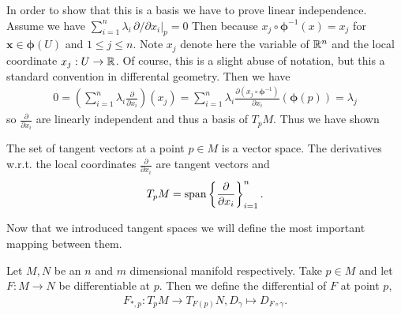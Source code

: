 \documentclass[../main.tex]{subfiles}
\begin{document}
In order to show that this is a basis we have to prove linear independence.
Assume we have $\sum_{i=1}^n \lambda_i \, \partial/\partial x_i|_p = 0$
Then because $x_j \circ \bm{\phi}^{-1} (x) = x_j$ for $\mathbf{x} \in \bm{\phi}(U)$ and 
$1 \leq j \leq n$. Note $x_j$ denote here the variable of 
$\mathbb{R}^n$ and the local coordinate $x_j:U \rightarrow \mathbb{R}$. Of course, 
this is a slight abuse of notation, but this a standard convention in 
differental geometry.
Then we have 
\begin{align*}
    0 = \left( \sum\limits_{i=1}^n \lambda_i \frac{\partial}{\partial x_i}
        \right) (x_j)
    = \sum\limits_{i=1}^n \lambda_i \frac{\partial (x_j \circ \bm{\phi}^{-1})}{\partial x_i}(\bm{\phi}(p))
    = \lambda_j
\end{align*}
so $\frac{\partial}{\partial x_i}$ are
linearly independent and thus a basis of $T_p M$. Thus we have shown

\begin{proposition}
    The set of tangent vectors at a point $p \in M$ is a vector space. 
    The derivatives w.r.t. the local coordinates $\frac{\partial}{\partial x_i}$ 
    are tangent vectors and 
    \begin{align*}
        T_p M = \operatorname{span} \left\{ \frac{\partial}{\partial x_i} \right\} _{i=1}^n.
    \end{align*}
\end{proposition}

Now that we introduced tangent spaces we will define the most important 
mapping between them.
\begin{definition}[Differential]
    Let $M, N$ be an $n$ and $m$ dimensional manifold respectively. 
    Take $p \in M$ and let $F:M \rightarrow N$ be differentiable at $p$. 
    Then we define the differential of $F$ at point $p$,
    \begin{align*}
        F_{*,p}: T_p M \rightarrow T_{F(p)} N, D_\gamma \mapsto D_{F\circ \gamma}.
    \end{align*}
\end{definition}
\end{document}
